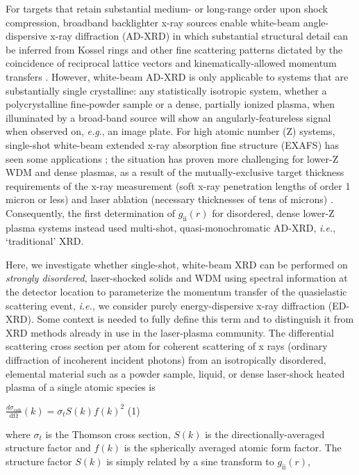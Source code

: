 For targets that retain substantial medium- or long-range order upon
shock compression, broadband backlighter x-ray sources enable white-beam
angle-dispersive x-ray diffraction (AD-XRD) in which substantial
structural detail can be inferred from Kossel rings
 \cite{lider2011x}
and other fine scattering patterns dictated by the coincidence of
reciprocal lattice vectors and kinematically-allowed momentum transfers
 \cite{suggit2010nanosecond}.
However, white-beam AD-XRD is only applicable to systems that are
substantially single crystalline: any statistically isotropic system,
whether a polycrystalline fine-powder sample or a dense, partially
ionized plasma, when illuminated by a broad-band source will show an
angularly-featureless signal when observed on, \emph{e.g}., an image
plate. For high atomic number (Z) systems, single-shot white-beam
extended x-ray absorption fine structure (EXAFS) has seen some
applications
 \cite{yaakobi2005exafs};
the situation has proven more challenging for lower-Z WDM and dense
plasmas, as a result of the mutually-exclusive target thickness
requirements of the x-ray measurement (soft x-ray penetration lengths of
order 1 micron or less) and laser ablation (necessary thicknesses of
tens of microns)
 \cite{bourgade2004new}.
Consequently, the first determination of
\(g_{\text{ii}}\left( r \right)\) for disordered, dense lower-Z plasma
systems
 \cite{ma2013x}
instead used multi-shot, quasi-monochromatic AD-XRD, \emph{i.e.},
`traditional' XRD.

Here, we investigate whether single-shot, white-beam XRD can be
performed on \emph{strongly disordered}, laser-shocked solids and WDM
using spectral information at the detector location to parameterize the
momentum transfer of the quasielastic scattering event, \emph{i.e.,} we
consider purely energy-dispersive x-ray diffraction (ED-XRD). Some
context is needed to fully define this term and to distinguish it from
XRD methods already in use in the laser-plasma community. The
differential scattering cross section per atom for coherent scattering
of x rays (ordinary diffraction of incoherent incident photons) from an
isotropically disordered, elemental material such as a powder sample,
liquid, or dense laser-shock heated plasma of a single atomic species is

\(\frac{d\sigma_{\text{coh}}}{\text{dΩ}}\left( k \right) = \sigma_{t}S\left( k \right){f\left( k \right)}^{2}\)
(1)

where \(\sigma_{t}\) is the Thomson cross section, \(S(k)\) is the
directionally-averaged structure factor and \(f\left( k \right)\) is the
spherically averaged atomic form factor. The structure factor \(S(k)\)
is simply related by a sine transform to
\(g_{\text{ii}}\left( r \right)\),


